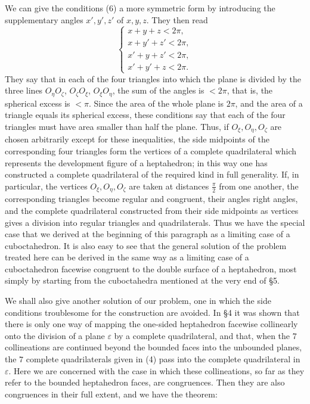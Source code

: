 \documentclass[11pt,a4paper]{article}
\begin{document}
We can give the conditions (6) a more symmetric form by introducing the supplementary angles $x',y',z'$ of $x,y,z$. They then read
\[
\left\{
\begin{array}{l}
 x+y+z<2\pi,\\
 x+y'+z'<2\pi,\\
 x'+y+z'<2\pi,\\
 x'+y'+z<2\pi.
\end{array}
\right.\tag{6a}
\]
They say that in each of the four triangles into which the plane is divided by the three lines $O_\eta O_\zeta$, $O_\zeta O_\xi$, $O_\xi O_\eta$, the sum of the angles is $<2\pi$, that is, the spherical excess is $<\pi$. Since the area of the whole plane is $2\pi$, and the area of a triangle equals its spherical excess, these conditions say that each of the four triangles must have area smaller than half the plane. Thus, if $O_\xi,O_\eta,O_\zeta$ are chosen arbitrarily except for these inequalities, the side midpoints of the corresponding four triangles form the vertices of a complete quadrilateral which represents the development figure of a heptahedron; in this way one has constructed a complete quadrilateral of the required kind in full generality. If, in particular, the vertices $O_\xi,O_\eta,O_\zeta$ are taken at distances $\frac{\pi}{2}$ from one another, the corresponding triangles become regular and congruent, their angles right angles, and the complete quadrilateral constructed from their side midpoints as vertices gives a division into regular triangles and quadrilaterals. Thus we have the special case that we derived at the beginning of this paragraph as a limiting case of a cuboctahedron. It is also easy to see that the general solution of the problem treated here can be derived in the same way as a limiting case of a cuboctahedron facewise congruent to the double surface of a heptahedron, most simply by starting from the cuboctahedra mentioned at the very end of \S 5.

We shall also give another solution of our problem, one in which the side conditions troublesome for the construction are avoided. In \S 4 it was shown that there is only one way of mapping the one-sided heptahedron facewise collinearly onto the division of a plane $\varepsilon$ by a complete quadrilateral, and that, when the $7$ collineations are continued beyond the bounded faces into the unbounded planes, the $7$ complete quadrilaterals given in (4) pass into the complete quadrilateral in $\varepsilon$. Here we are concerned with the case in which these collineations, so far as they refer to the bounded heptahedron faces, are congruences. Then they are also congruences in their full extent, and we have the theorem:
\end{document}
